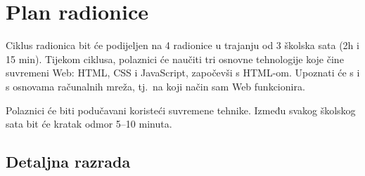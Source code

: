 \section{Plan radionice}\label{sec:plan-radionice}
Ciklus radionica bit će podijeljen na 4 radionice u trajanju od 3 školska sata (2h i 15 min).
Tijekom ciklusa, polaznici će naučiti tri osnovne tehnologije koje čine suvremeni Web: HTML, CSS i JavaScript, započevši s HTML-om.
Upoznati će s i s osnovama računalnih mreža, tj.\ na koji način sam Web funkcionira.

Polaznici će biti podučavani koristeći suvremene tehnike.
Između svakog školskog sata bit će kratak odmor 5--10 minuta.

\subsection{Detaljna razrada}\label{subsec:detaljna-razrada}


